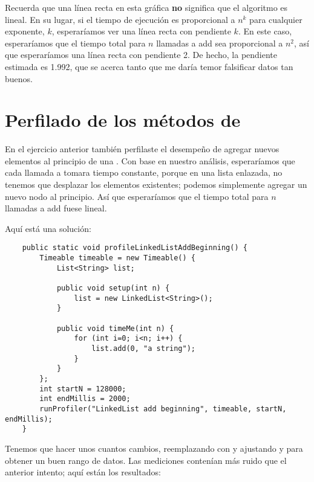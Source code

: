 \documentclass[12pt]{book}
\theoremstyle{exercise}
\begin{document}
Recuerda que una línea recta en esta gráfica \textbf{no} significa que
el algoritmo es lineal. En su lugar, si el tiempo de ejecución es proporcional a
$n^k$ para cualquier exponente, $k$, esperaríamos ver una línea recta
con pendiente $k$. En este caso, esperaríamos que el tiempo total para $n$ llamadas a
add sea proporcional a $n^2$, así que esperaríamos una línea recta con pendiente
2. De hecho, la pendiente estimada es 1.992, que se acerca tanto que me daría
temor falsificar datos tan buenos.



\section{Perfilado de los métodos de }
\label{profiling-linkedlist-methods}

En el ejercicio anterior también perfilaste el desempeño de agregar nuevos
elementos al principio de una . Con base en nuestro
análisis, esperaríamos que cada llamada a  tomara tiempo constante,
porque en una lista enlazada, no tenemos que desplazar los elementos existentes;
podemos simplemente agregar un nuevo nodo al principio. Así que esperaríamos
que el tiempo total para $n$ llamadas a add fuese lineal.


Aquí está una solución:

\begin{verbatim}
    public static void profileLinkedListAddBeginning() {
        Timeable timeable = new Timeable() {
            List<String> list;

            public void setup(int n) {
                list = new LinkedList<String>();
            }

            public void timeMe(int n) {
                for (int i=0; i<n; i++) {
                    list.add(0, "a string");
                }
            }
        };
        int startN = 128000;
        int endMillis = 2000;
        runProfiler("LinkedList add beginning", timeable, startN, endMillis);
    }
\end{verbatim}

Tenemos que hacer unos cuantos cambios, reemplazando
 con  y ajustando
 y  para obtener un buen rango de datos.
Las mediciones contenían más ruido que el anterior intento; aquí están
los resultados:
\end{document}
